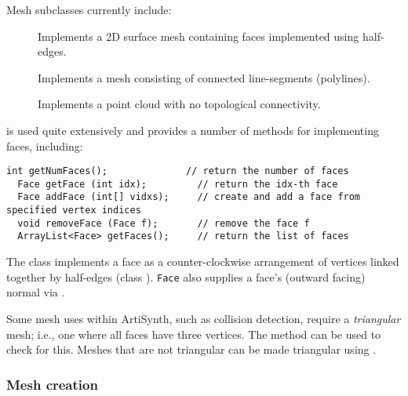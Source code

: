 Mesh subclasses currently include:

\begin{description}

\item[]\mbox{}

Implements a 2D surface
mesh containing faces implemented using half-edges.

\item[]\mbox{}

Implements a mesh
consisting of connected line-segments (polylines).

\item[]\mbox{}

Implements a point cloud with
no topological connectivity.

\end{description}

 is used quite extensively
and provides a number of methods for implementing faces, including:
%
\begin{lstlisting}[]
  int getNumFaces();              // return the number of faces
  Face getFace (int idx);         // return the idx-th face
  Face addFace (int[] vidxs);     // create and add a face from specified vertex indices
  void removeFace (Face f);       // remove the face f
  ArrayList<Face> getFaces();     // return the list of faces
\end{lstlisting}
%
The class  implements a face as a
counter-clockwise arrangement of vertices linked together by
half-edges (class ).
{\tt Face} also supplies a face's (outward facing) normal
via 
.

Some mesh uses within ArtiSynth, such as collision detection, require a
{\it triangular} mesh; i.e., one where all faces have three vertices.
The method 
can be used to check for this. Meshes that are not triangular can be
made triangular using 
.

\subsubsection{Mesh creation}

